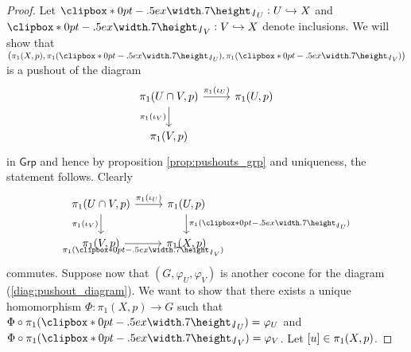 \begin{proof}
	Let $\jota_U : U \hookrightarrow X$ and $\jota_V : V \hookrightarrow X$ denote inclusions. We will show that $\del[1]{\pi_1(X,p), \pi_1(\jota_U),\pi_1(\jota_V)}$ is a pushout of the diagram
	\begin{equation}
		\begin{tikzcd}
			\pi_1(U \cap V,p) \arrow[r,"\pi_1(\iota_U)"]\arrow[d,"\pi_1(\iota_V)"'] & \pi_1(U,p)\\
			\pi_1(V,p)
		\end{tikzcd}
		\label{diag:pushout_diagram}
	\end{equation}
	\noindent in $\mathsf{Grp}$ and hence by proposition \ref{prop:pushouts_grp} and uniqueness, the statement follows. Clearly
	\begin{equation*}
		\begin{tikzcd}
			\pi_1(U \cap V,p) \arrow[r,"\pi_1(\iota_U)"]\arrow[d,"\pi_1(\iota_V)"'] & \pi_1(U,p)\arrow[d,"\pi_1(\jota_U)"]\\
			\pi_1(V,p) \arrow[r,"\pi_1(\jota_V)"'] & \pi_1(X,p)
		\end{tikzcd}
	\end{equation*}
	\noindent commutes. Suppose now that $(G,\varphi_U,\varphi_V)$ is another cocone for the diagram (\ref{diag:pushout_diagram}). We want to show that there exists a unique homomorphism $\Phi : \pi_1(X,p) \to G$ such that $\Phi \circ \pi_1(\jota_U) = \varphi_U$ and $\Phi \circ \pi_1(\jota_V) = \varphi_V$. Let $\sbr{u} \in \pi_1(X,p)$. 

\end{proof}
